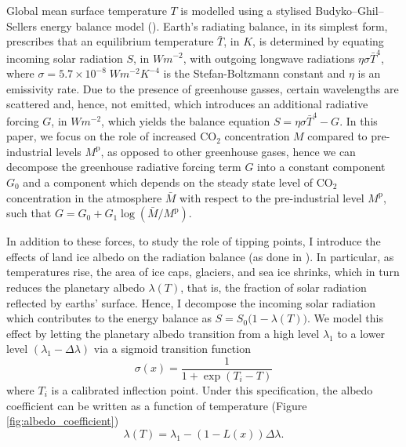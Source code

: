 \documentclass[../../main.tex]{subfiles}
\begin{document}
Global mean surface temperature $T$ is modelled using a stylised Budyko–Ghil–Sellers energy balance model (\cite{hogg_glacial_2008, ashwin_extreme_2020}). Earth's radiating balance, in its simplest form, prescribes that an equilibrium temperature $\bar{T}$, in $\unit{K}$, is determined by equating incoming solar radiation $S$, in $\unit{W}\unit{m}^{-2}$, with outgoing longwave radiations $\eta \sigma \bar{T}^4$, where $\sigma = 5.7 \times 10^{-8} \; \unit{W} \unit{m}^{-2} \unit{K}^{-4}$ is the Stefan-Boltzmann constant and $\eta$ is an emissivity rate. Due to the presence of greenhouse gasses, certain wavelengths are scattered and, hence, not emitted, which introduces an additional radiative forcing $G$, in $\unit{W}\unit{m}^{-2}$, which yields the balance equation $S = \eta \sigma \bar{T}^4 - G$. In this paper, we focus on the role of increased CO$_2$ concentration $M$ compared to pre-industrial levels $M^{\mathrm{p}}$, as opposed to other greenhouse gases, hence we can decompose the greenhouse radiative forcing term $G$ into a constant component $G_0$ and a component which depends on the steady state level of CO$_2$ concentration in the atmosphere $\bar{M}$ with respect to the pre-industrial level $M^{\mathrm{p}}$, such that $G = G_0 + G_1 \log(\bar{M} / M^{\mathrm{p}})$.

In addition to these forces, to study the role of tipping points, I introduce the effects of land ice albedo on the radiation balance (as done in \cite{ghil_topics_2011,dijkstra_sensitivity_2015}). In particular, as temperatures rise, the area of ice caps, glaciers, and sea ice shrinks, which in turn reduces the planetary albedo $\lambda(T)$, that is, the fraction of solar radiation reflected by earths' surface. Hence, I decompose the incoming solar radiation which contributes to the energy balance as $S = S_0 \big(1 - \lambda(T)\big)$. We model this effect by letting the planetary albedo transition from a high level $\lambda_1$ to a lower level $(\lambda_1 - \Delta \lambda)$ via a sigmoid transition function \begin{equation}
    \sigma(x) = \frac{1}{1 + \exp(T_i - T)}
\end{equation} where $T_i$ is a calibrated inflection point. Under this specification, the albedo coefficient can be written as a function of temperature (Figure \ref{fig:albedo_coefficient}) \begin{equation} \label{eq:assumption:albedo}
    \lambda(T) = \lambda_1 - (1 - L(x)) \Delta \lambda.
\end{equation} 
\end{document}
